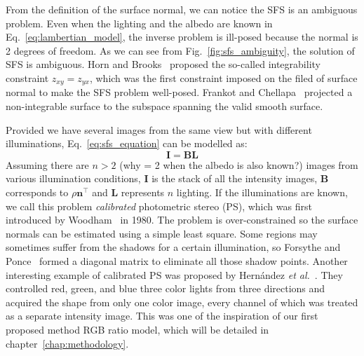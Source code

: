 From the definition of the surface normal, we can notice the SFS is an ambiguous problem. 
Even when the lighting and the albedo are known in Eq.~\ref{eq:lambertian_model}, the inverse problem is ill-posed because the normal is 2 degrees of freedom. 
As we can see from Fig.~\ref{fig:sfs_ambiguity}, the solution of SFS is ambiguous.
Horn and Brooks~\cite{horn1986variational} proposed the so-called integrability constraint $z_{xy} = z_{yx}$, which was the first constraint imposed on the filed of surface normal to make the SFS problem well-posed. 
Frankot and Chellapa~\cite{frankot1988method} projected a non-integrable surface to the subspace spanning the valid smooth surface.


Provided we have several images from the same view but with different illuminations, Eq.~\ref{eq:sfs_equation} can be modelled as:
\begin{equation}\label{eq:ps_equation}
    \mathbf{I = BL}
\end{equation}
Assuming there are $n > 2$ {\color{red}(why = 2 when the albedo is also known?)} images from various illumination conditions, $\mathbf{I}$ is the stack of all the intensity images, $\mathbf{B}$ corresponds to $\rho \mathbf{n}^\top$ and $\mathbf{L}$ represents $n$ lighting.
If the illuminations are known, we call this problem \emph{calibrated} photometric stereo (PS), which was first introduced by Woodham~\cite{woodham1980photometric} in 1980. The problem is over-constrained so the surface normals can be estimated using a simple least square. 
Some regions may sometimes suffer from the shadows for a certain illumination, so Forsythe and Ponce~\cite{forsyth2003modern} formed a diagonal matrix to eliminate all those shadow points.
Another interesting example of calibrated PS was proposed by Hern{\'a}ndez \emph{et al.}~\cite{hernandez2011overcoming}.
They controlled red, green, and blue three color lights from three directions and acquired the shape from only one color image, every channel of which was treated as a separate intensity image.   
This was one of the inspiration of our first proposed method RGB ratio model, which will be detailed in chapter~\ref{chap:methodology}.

